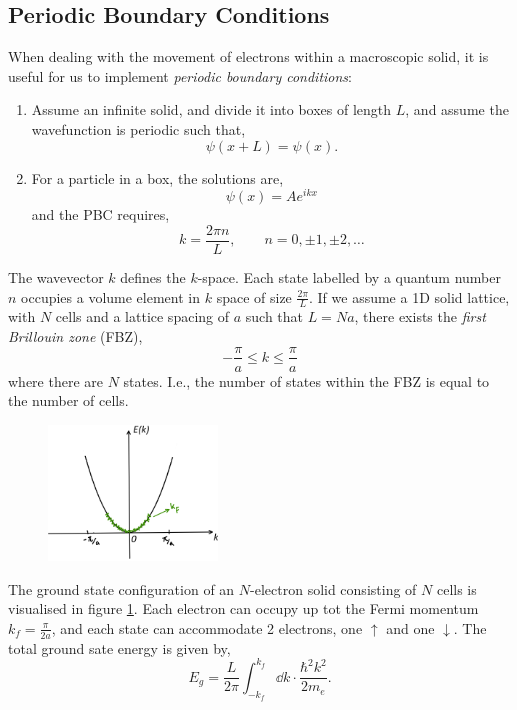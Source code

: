 \documentclass{book}
\begin{document}
\subsection{Periodic Boundary Conditions}
When dealing with the movement of electrons within a macroscopic solid, it is useful for us to implement \textit{periodic boundary conditions}:
\begin{enumerate}
	\item Assume an infinite solid, and divide it into boxes of length $L$, and assume the wavefunction is periodic such that,
	\begin{equation}
		\psi(x+L) = \psi(x).
	\end{equation}
	\item For a particle in a box, the solutions are,
	\begin{equation}
		\psi(x) = Ae^{ikx}
	\end{equation}
	and the PBC requires,
	\begin{equation}
		k = \frac{2\pi n}{L}, \hspace{2em} 	n=0,\pm1,\pm2,\ldots
	\end{equation}
\end{enumerate}
The wavevector $k$ defines the $k$-space. Each state labelled by a quantum number $n$ occupies a volume element in $k$ space of size $\frac{2\pi}{L}$. If we assume a 1D solid lattice, with $N$ cells and a lattice spacing of $a$ such that $L = Na$, there exists the \textit{first Brillouin zone} (FBZ),
\begin{equation}
	-\frac{\pi}{a} \leq k \leq \frac{\pi}{a}
\end{equation}
where there are $N$ states. I.e., the number of states within the FBZ is equal to the number of cells. 
\begin{figure}[h]
	\centering
	\includegraphics[width=0.4\textwidth]{freeeee.png}
	\caption{}
	\label{fig:freeeee}
\end{figure}
The ground state configuration of an $N$-electron solid consisting of $N$ cells is visualised in figure \ref{fig:freeeee}. Each electron can occupy up tot the Fermi momentum $k_f = \frac{\pi}{2a}$, and each state can accommodate 2 electrons, one $\uparrow$ and one $\downarrow$. The total ground sate energy is given by,
\begin{equation}
	E_g = \frac{L}{2\pi}\int_{-k_f}^{k_f} \dd{k}\cdot \frac{\hbar^2k^2}{2m_e}.
\end{equation}
\end{document}
